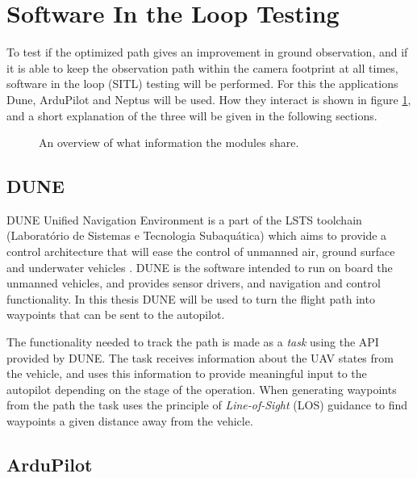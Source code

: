 \section{Software In the Loop Testing}

To test if the optimized path gives an improvement in ground observation, and if it is able to keep the observation path within the camera footprint at all times, software in the loop (SITL) testing will be performed. For this the applications Dune, ArduPilot and Neptus will be used. How they interact is shown in figure \ref{fig:sitl_overview}, and a short explanation of the three will be given in the following sections.

\begin{figure}[h]
	\centering
	\caption{An overview of what information the modules share.}
	\label{fig:sitl_overview}
\end{figure}

\subsection{DUNE}

DUNE Unified Navigation Environment is a part of the LSTS toolchain (Laboratório de Sistemas e Tecnologia Subaquática) which aims to provide a control architecture that will ease the control of unmanned air, ground surface and underwater vehicles \cite{DUNE}. DUNE is the software intended to run on board the unmanned vehicles, and provides sensor drivers, and navigation and control functionality. In this thesis DUNE will be used to turn the flight path into waypoints that can be sent to the autopilot.

The functionality needed to track the path is made as a \textit{task} using the API provided by DUNE. The task receives information about the UAV states from the vehicle, and uses this information to provide meaningful input to the autopilot depending on the stage of the operation. When generating waypoints from the path the task uses the principle of \textit{Line-of-Sight} (LOS) guidance to find waypoints a given distance away from the vehicle.


\subsection{ArduPilot}

